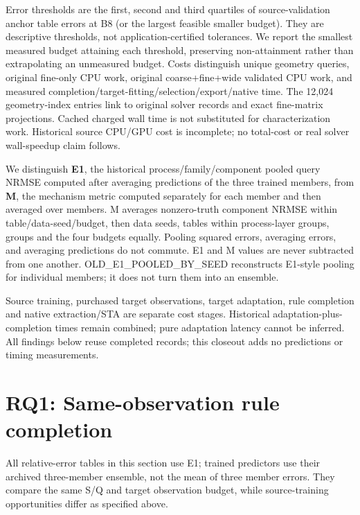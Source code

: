 \documentclass[10pt,twocolumn]{article}
\begin{document}
Error thresholds are the first, second and third quartiles of source-validation anchor table errors at B8 (or the largest feasible smaller budget). They are descriptive thresholds, not application-certified tolerances. We report the smallest measured budget attaining each threshold, preserving non-attainment rather than extrapolating an unmeasured budget. Costs distinguish unique geometry queries, original fine-only CPU work, original coarse+fine+wide validated CPU work, and measured completion/target-fitting/selection/export/native time. The 12,024 geometry-index entries link to original solver records and exact fine-matrix projections. Cached charged wall time is not substituted for characterization work. Historical source CPU/GPU cost is incomplete; no total-cost or real solver wall-speedup claim follows.

We distinguish \textbf{E1}, the historical process/family/component pooled query NRMSE computed after averaging predictions of the three trained members, from \textbf{M}, the mechanism metric computed separately for each member and then averaged over members. M averages nonzero-truth component NRMSE within table/data-seed/budget, then data seeds, tables within process-layer groups, groups and the four budgets equally. Pooling squared errors, averaging errors, and averaging predictions do not commute. E1 and M values are never subtracted from one another. OLD\_E1\_POOLED\_BY\_SEED reconstructs E1-style pooling for individual members; it does not turn them into an ensemble.

Source training, purchased target observations, target adaptation, rule completion and native extraction/STA are separate cost stages. Historical adaptation-plus-completion times remain combined; pure adaptation latency cannot be inferred. All findings below reuse completed records; this closeout adds no predictions or timing measurements.

\section*{RQ1: Same-observation rule completion}

All relative-error tables in this section use E1; trained predictors use their archived three-member ensemble, not the mean of three member errors. They compare the same S/Q and target observation budget, while source-training opportunities differ as specified above.
\end{document}
